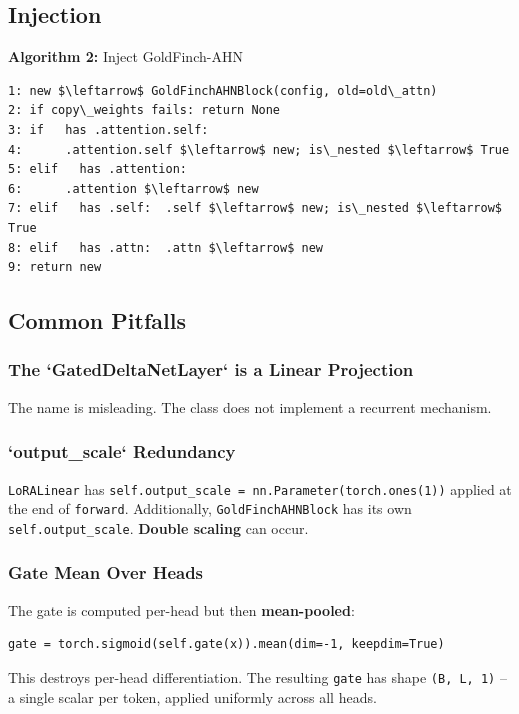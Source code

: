 \subsection{Injection}

\textbf{Algorithm 2:} Inject GoldFinch-AHN
\begin{lstlisting}
1: new $\leftarrow$ GoldFinchAHNBlock(config, old=old\_attn)
2: if copy\_weights fails: return None
3: if   has .attention.self:
4:      .attention.self $\leftarrow$ new; is\_nested $\leftarrow$ True
5: elif   has .attention:
6:      .attention $\leftarrow$ new
7: elif   has .self:  .self $\leftarrow$ new; is\_nested $\leftarrow$ True
8: elif   has .attn:  .attn $\leftarrow$ new
9: return new
\end{lstlisting}

\subsection{Common Pitfalls}

\subsubsection{The `GatedDeltaNetLayer` is a Linear Projection}

The name is misleading. The class does not implement a recurrent mechanism.

\subsubsection{`output\_scale` Redundancy}

\texttt{LoRALinear} has \texttt{self.output\_scale = nn.Parameter(torch.ones(1))} applied 
at the end of \texttt{forward}. Additionally, \texttt{GoldFinchAHNBlock} has its own 
\texttt{self.output\_scale}. \textbf{Double scaling} can occur.

\subsubsection{Gate Mean Over Heads}

The gate is computed per-head but then \textbf{mean-pooled}:

\begin{lstlisting}
gate = torch.sigmoid(self.gate(x)).mean(dim=-1, keepdim=True)
\end{lstlisting}

This destroys per-head differentiation. The resulting \texttt{gate} has shape 
\texttt{(B, L, 1)} -- a single scalar per token, applied uniformly across all heads.


